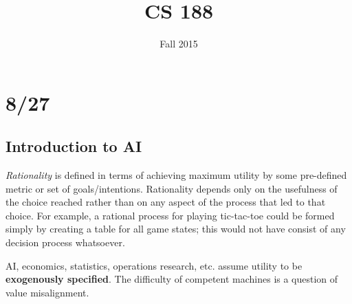 \documentclass[12pt]{article}
\title{CS 188}
\date{\normalsize Fall 2015}
\begin{document}
\maketitle

\section{8/27}

\subsection{Introduction to AI}
\noindent
\textit{Rationality} is defined in terms of achieving maximum utility by some pre-defined metric or set of goals/intentions.  Rationality depends only on the usefulness of the choice reached rather than on any aspect of the process that led to that choice.  For example, a rational process for playing tic-tac-toe could be formed simply by creating a table for all game states; this would not have consist of any decision process whatsoever.

\noindent
AI, economics, statistics, operations research, etc. assume utility to be \textbf{exogenously specified}.  The difficulty of competent machines is a question of value misalignment.
\end{document}
